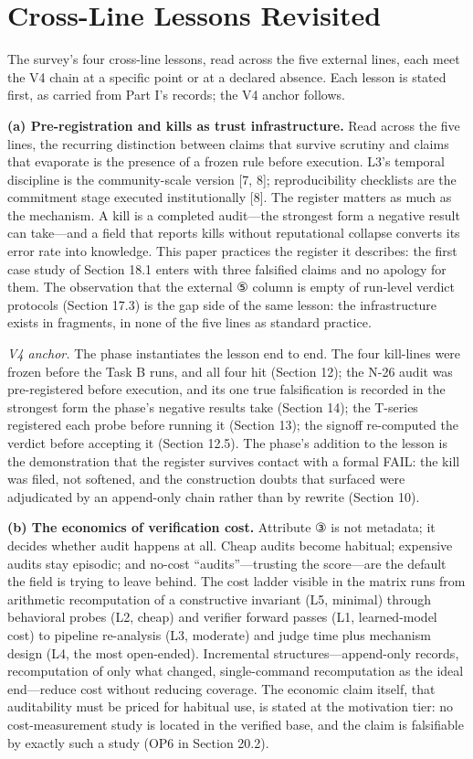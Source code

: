 \documentclass[11pt]{article}
\begin{document}
\section{Cross-Line Lessons Revisited}
\label{sec:19}
\noindent The survey's four cross-line lessons, read across the five external lines, each meet the V4 chain at a specific point or at a declared absence. Each lesson is stated first, as carried from Part I's records; the V4 anchor follows.\par
\noindent \textbf{(a) Pre-registration and kills as trust infrastructure.} Read across the five lines, the recurring distinction between claims that survive scrutiny and claims that evaporate is the presence of a frozen rule before execution. L3's temporal discipline is the community-scale version [7, 8]; reproducibility checklists are the commitment stage executed institutionally [8]. The register matters as much as the mechanism. A kill is a completed audit—the strongest form a negative result can take—and a field that reports kills without reputational collapse converts its error rate into knowledge. This paper practices the register it describes: the first case study of Section 18.1 enters with three falsified claims and no apology for them. The observation that the external ⑤ column is empty of run-level verdict protocols (Section 17.3) is the gap side of the same lesson: the infrastructure exists in fragments, in none of the five lines as standard practice.\par
\noindent \emph{V4 anchor.} The phase instantiates the lesson end to end. The four kill-lines were frozen before the Task B runs, and all four hit (Section 12); the N-26 audit was pre-registered before execution, and its one true falsification is recorded in the strongest form the phase's negative results take (Section 14); the T-series registered each probe before running it (Section 13); the signoff re-computed the verdict before accepting it (Section 12.5). The phase's addition to the lesson is the demonstration that the register survives contact with a formal FAIL: the kill was filed, not softened, and the construction doubts that surfaced were adjudicated by an append-only chain rather than by rewrite (Section 10).\par
\noindent \textbf{(b) The economics of verification cost.} Attribute ③ is not metadata; it decides whether audit happens at all. Cheap audits become habitual; expensive audits stay episodic; and no-cost ``audits''—trusting the score—are the default the field is trying to leave behind. The cost ladder visible in the matrix runs from arithmetic recomputation of a constructive invariant (L5, minimal) through behavioral probes (L2, cheap) and verifier forward passes (L1, learned-model cost) to pipeline re-analysis (L3, moderate) and judge time plus mechanism design (L4, the most open-ended). Incremental structures—append-only records, recomputation of only what changed, single-command recomputation as the ideal end—reduce cost without reducing coverage. The economic claim itself, that auditability must be priced for habitual use, is stated at the motivation tier: no cost-measurement study is located in the verified base, and the claim is falsifiable by exactly such a study (OP6 in Section 20.2).\par
\end{document}

